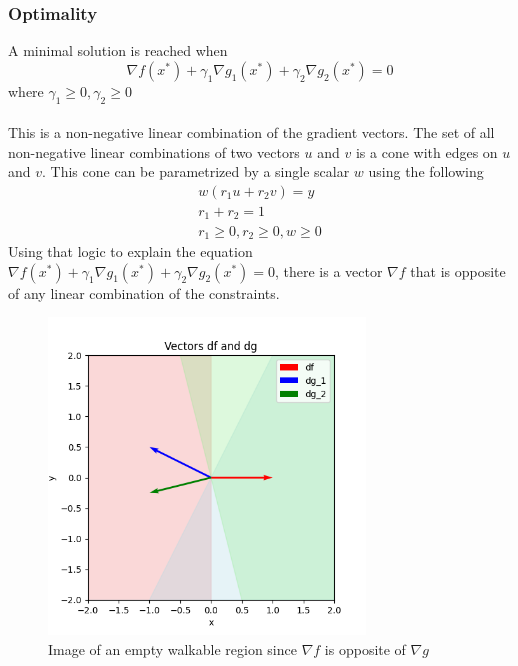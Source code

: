 \subsubsection{Optimality}
A minimal solution is reached when
\begin{equation}
  \nabla f(x^*) + \gamma_1 \nabla g_1(x^*) + \gamma_2 \nabla g_2(x^*)  = 0
\end{equation}
where $\gamma_1 \geq 0, \gamma_2 \geq 0$
\\ \\
This is a non-negative linear combination of the gradient vectors. The set of all non-negative linear combinations of two vectors $u$ and $v$ is a cone with edges on $u$ and $v$. This cone can be parametrized by a single scalar $w$ using the following
\begin{equation}
  \begin{aligned}
    w(r_1 u + r_2 v) = y \\
    r_1+ r_2 = 1 \\
    r_1 \geq 0, r_2 \geq 0, w \geq 0
  \end{aligned}
\end{equation}
Using that logic to explain the equation $\nabla f(x^*) + \gamma_1 \nabla g_1(x^*) + \gamma_2 \nabla g_2(x^*)  = 0$, there is a vector $\nabla f$ that is opposite of any linear combination of the constraints.

\begin{figure}[htbp]
  \centerline{\includegraphics[width=0.75\textwidth]{images/empty_walkable_region.png}}
  \caption{Image of an empty walkable region since $\nabla f$ is opposite of $\nabla g$}
  \label{fig:empty_walkable_region}
\end{figure}

